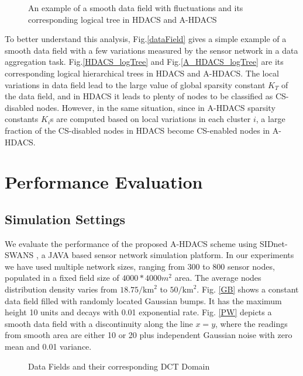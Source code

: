 \documentclass[conference]{IEEEtran}
\begin{document}
\begin{figure*}
\centering 
{}
\qquad
{}
\qquad
{}
\caption{An example of a smooth data field with fluctuations and its corresponding logical tree in HDACS and A-HDACS}
\end{figure*}

To better understand this analysis, Fig.\ref{dataField} gives a simple example of a smooth data field 
with a few variations measured by the sensor network in a data aggregation task.
Fig.\ref{HDACS_logTree} and Fig.\ref{A_HDACS_logTree} are its corresponding logical hierarchical trees 
in HDACS and A-HDACS. The local variations in data field lead to 
the large value of global sparsity constant $K_T$ of the data field, and in HDACS it leads to plenty of nodes to be classified 
as CS-disabled 
nodes. However, in the same situation, since in A-HDACS sparsity constants $K_i$s are computed based on local variations in each cluster $i$,
a large fraction of the CS-disabled nodes in HDACS become CS-enabled nodes in A-HDACS. 

\section{Performance Evaluation}
\subsection{Simulation Settings}
We evaluate the performance of the proposed A-HDACS scheme using SIDnet-SWANS \cite{SIDnet}, a JAVA based sensor network simulation platform. 
In our experiments we have used multiple network sizes, ranging from 300 to 800 sensor nodes, populated in a fixed field size of $4000*4000 m^2$ area.
The average nodes distribution density varies from 
$18.75 / \text{km}^2$ to $50 / \text{km}^2$. Fig. \ref{GB} shows a constant data field filled 
with randomly located Gaussian bumps. It has the maximum height 10 units and decays with 0.01 exponential rate. 
Fig. \ref{PW} depicts a smooth data field with a discontinuity along the line 
$x=y$, where the readings from smooth area are either 10 or 20 plus independent Gaussian noise 
with zero mean and 0.01 variance. 
\begin{figure*}
\centering
{}
\qquad
{}
\qquad
{}
\qquad
{}
\caption{Data Fields and their corresponding DCT Domain}
\end{figure*}
\end{document}
